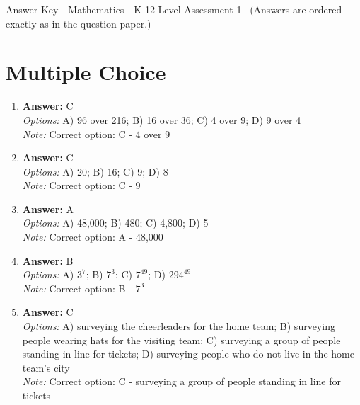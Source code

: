 \documentclass[12pt]{article}
\begin{document}
\begin{center}
Answer Key - Mathematics - K-12 Level Assessment 1 \
\small (Answers are ordered exactly as in the question paper.)
\end{center}

\section*{Multiple Choice}
\begin{enumerate}[label=\arabic*.]
\item \textbf{Answer:} C
\\ \textit{Options:} A) 96 over 216; B) 16 over 36; C) 4 over 9; D) 9 over 4
\\ \textit{Note:} Correct option: C - 4 over 9
\item \textbf{Answer:} C
\\ \textit{Options:} A) 20; B) 16; C) 9; D) 8
\\ \textit{Note:} Correct option: C - 9
\item \textbf{Answer:} A
\\ \textit{Options:} A) 48,000; B) 480; C) 4,800; D) 5
\\ \textit{Note:} Correct option: A - 48,000
\item \textbf{Answer:} B
\\ \textit{Options:} A) $3^7$; B) $7^3$; C) $7^49$; D) $294^49$
\\ \textit{Note:} Correct option: B - $7^3$
\item \textbf{Answer:} C
\\ \textit{Options:} A) surveying the cheerleaders for the home team; B) surveying people wearing hats for the visiting team; C) surveying a group of people standing in line for tickets; D) surveying people who do not live in the home team's city
\\ \textit{Note:} Correct option: C - surveying a group of people standing in line for tickets
\end{enumerate}
\end{document}
